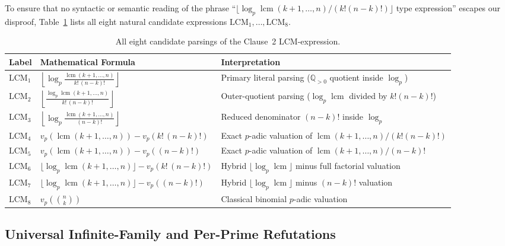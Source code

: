\documentclass[11pt,a4paper]{article}
\theoremstyle{definition}
\theoremstyle{remark}
\newcommand{\lcm}{\operatorname{lcm}}
\begin{document}
To ensure that no syntactic or semantic reading of the phrase
``$\lfloor \log_p \lcm(k+1,\dots,n)/(k!(n-k)!)\rfloor$ type expression'' escapes our
disproof, Table~\ref{tab:parsings} lists all eight natural candidate expressions
$\mathrm{LCM}_1,\dots,\mathrm{LCM}_8$.

\begin{table}[ht]
\centering
\small
\renewcommand{\arraystretch}{1.35}
\begin{tabular}{@{}ll>{\raggedright\arraybackslash}p{6.2cm}@{}}
\hline
\textbf{Label} & \textbf{Mathematical Formula} & \textbf{Interpretation} \\
\hline
$\mathrm{LCM}_1$ & $\displaystyle\left\lfloor \log_p \frac{\lcm(k+1,\dots,n)}{k!\,(n-k)!} \right\rfloor$
  & Primary literal parsing ($\mathbb{Q}_{>0}$ quotient inside $\log_p$) \\
$\mathrm{LCM}_2$ & $\displaystyle\left\lfloor \frac{\log_p \lcm(k+1,\dots,n)}{k!\,(n-k)!} \right\rfloor$
  & Outer-quotient parsing ($\log_p \lcm$ divided by $k!(n-k)!$) \\
$\mathrm{LCM}_3$ & $\displaystyle\left\lfloor \log_p \frac{\lcm(k+1,\dots,n)}{(n-k)!} \right\rfloor$
  & Reduced denominator $(n-k)!$ inside $\log_p$ \\
$\mathrm{LCM}_4$ & $v_p(\lcm(k+1,\dots,n)) - v_p(k!\,(n-k)!)$
  & Exact $p$-adic valuation of $\lcm(k+1,\dots,n)/(k!(n-k)!)$ \\
$\mathrm{LCM}_5$ & $v_p(\lcm(k+1,\dots,n)) - v_p((n-k)!)$
  & Exact $p$-adic valuation of $\lcm(k+1,\dots,n)/(n-k)!$ \\
$\mathrm{LCM}_6$ & $\lfloor \log_p \lcm(k+1,\dots,n)\rfloor - v_p(k!\,(n-k)!)$
  & Hybrid $\lfloor \log_p \lcm \rfloor$ minus full factorial valuation \\
$\mathrm{LCM}_7$ & $\lfloor \log_p \lcm(k+1,\dots,n)\rfloor - v_p((n-k)!)$
  & Hybrid $\lfloor \log_p \lcm \rfloor$ minus $(n-k)!$ valuation \\
$\mathrm{LCM}_8$ & $v_p\!\left(\binom{n}{k}\right)$
  & Classical binomial $p$-adic valuation \\
\hline
\end{tabular}
\caption{All eight candidate parsings of the Clause~2 LCM-expression.}
\label{tab:parsings}
\end{table}

\subsection{Universal Infinite-Family and Per-Prime Refutations}
\end{document}

